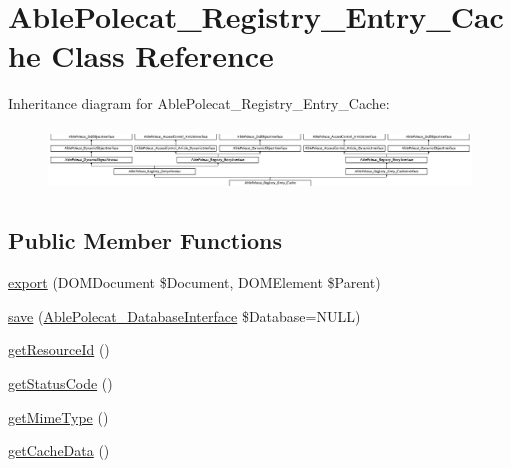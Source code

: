 \hypertarget{class_able_polecat___registry___entry___cache}{}\section{Able\+Polecat\+\_\+\+Registry\+\_\+\+Entry\+\_\+\+Cache Class Reference}
\label{class_able_polecat___registry___entry___cache}
Inheritance diagram for Able\+Polecat\+\_\+\+Registry\+\_\+\+Entry\+\_\+\+Cache\+:\begin{figure}[H]
\begin{center}
\leavevmode
\includegraphics[height=1.707317cm]{class_able_polecat___registry___entry___cache}
\end{center}
\end{figure}
\subsection*{Public Member Functions}
\begin{DoxyCompactItemize}
\item 
\hyperlink{class_able_polecat___registry___entry___cache_a0a05b2e4b3a44390eeb042064e427b1a}{export} (D\+O\+M\+Document \$Document, D\+O\+M\+Element \$Parent)
\item 
\hyperlink{class_able_polecat___registry___entry___cache_a999eef977eb899167ae02f83dd26a4ae}{save} (\hyperlink{interface_able_polecat___database_interface}{Able\+Polecat\+\_\+\+Database\+Interface} \$Database=N\+U\+L\+L)
\item 
\hyperlink{class_able_polecat___registry___entry___cache_a0ac412173b2b1d569ef90a1ac095ca5d}{get\+Resource\+Id} ()
\item 
\hyperlink{class_able_polecat___registry___entry___cache_a094778dd1c04fe44626000b47ea0c0bb}{get\+Status\+Code} ()
\item 
\hyperlink{class_able_polecat___registry___entry___cache_ac06e9f7b10fca30eb41e41d4dc108b1c}{get\+Mime\+Type} ()
\item 
\hyperlink{class_able_polecat___registry___entry___cache_a991b958b6b972356b973a9c68306bc4f}{get\+Cache\+Data} ()
\end{DoxyCompactItemize}
